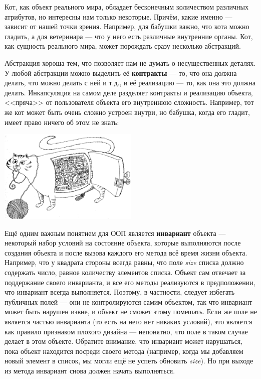 \documentclass[a5paper]{article}
\begin{document}
Кот, как объект реального мира, обладает бесконечным количеством различных атрибутов, но интересны нам только некоторые. Причём, какие именно --- зависит от нашей точки зрения. Например, для бабушки важно, что кота можно гладить, а для ветеринара --- что у него есть различные внутренние органы. Кот, как сущность реального мира, может порождать сразу несколько абстракций.

Абстракция хороша тем, что позволяет нам не думать о несущественных деталях. У любой абстракции можно выделить её \textbf{контракты} --- то, что она должна делать, что можно делать с ней и т.д., и её реализацию --- то, как она это должна делать. Инкапсуляция на самом деле разделяет контракты и реализацию объекта, <<пряча>> от пользователя объекта его внутреннюю сложность. Например, тот же кот может быть очень сложно устроен внутри, но бабушка, когда его гладит, имеет право ничего об этом не знать:

\begin{center}
    \includegraphics[width=0.5\textwidth]{incapsulation.png}
\end{center}

Ещё одним важным понятием для ООП является \textbf{инвариант} объекта --- некоторый набор условий на состояние объекта, которые выполняются после создания объекта и после вызова каждого его метода всё время жизни объекта. Например, что у квадрата стороны всегда равны, что поле \textit{size} списка должно содержать число, равное количеству элементов списка. Объект сам отвечает за поддержание своего инварианта, и все его методы реализуются в предположении, что инвариант всегда выполняется. Поэтому, в частности, следует избегать публичных полей --- они не контролируются самим объектом, так что инвариант может быть нарушен извне, и объект не сможет этому помешать. Если же поле не является частью инварианта (то есть на него нет никаких условий), это является как правило признаком плохого дизайна --- непонятно, что поле в таком случае делает в этом объекте. Обратите внимание, что инвариант может нарушаться, пока объект находится посреди своего метода (например, когда мы добавляем новый элемент в список, мы могли ещё не успеть обновить \textit{size}). Но при выходе из метода инвариант снова должен начать выполняться.
\end{document}
